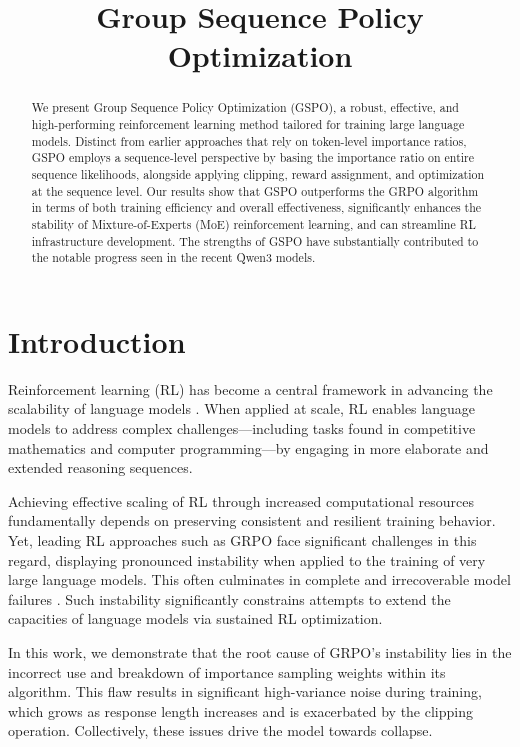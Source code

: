 \title{Group Sequence Policy Optimization}

\begin{abstract}
We present Group Sequence Policy Optimization (GSPO), a robust, effective, and high-performing reinforcement learning method tailored for training large language models. Distinct from earlier approaches that rely on token-level importance ratios, GSPO employs a sequence-level perspective by basing the importance ratio on entire sequence likelihoods, alongside applying clipping, reward assignment, and optimization at the sequence level. Our results show that GSPO outperforms the GRPO algorithm in terms of both training efficiency and overall effectiveness, significantly enhances the stability of Mixture-of-Experts (MoE) reinforcement learning, and can streamline RL infrastructure development. The strengths of GSPO have substantially contributed to the notable progress seen in the recent Qwen3 models.
\end{abstract}

\section{Introduction}
\label{sec:intro}

Reinforcement learning (RL) has become a central framework in advancing the scalability of language models \citep{o1,dpsk-r1,qwq32b,qwen3}. When applied at scale, RL enables language models to address complex challenges—including tasks found in competitive mathematics and computer programming—by engaging in more elaborate and extended reasoning sequences.

Achieving effective scaling of RL through increased computational resources fundamentally depends on preserving consistent and resilient training behavior. Yet, leading RL approaches such as GRPO \citep{grpo} face significant challenges in this regard, displaying pronounced instability when applied to the training of very large language models. This often culminates in complete and irrecoverable model failures \citep{qwen3, minimax-m1}. Such instability significantly constrains attempts to extend the capacities of language models via sustained RL optimization.

In this work, we demonstrate that the root cause of GRPO’s instability lies in the incorrect use and breakdown of importance sampling weights within its algorithm. This flaw results in significant high-variance noise during training, which grows as response length increases and is exacerbated by the clipping operation. Collectively, these issues drive the model towards collapse.

